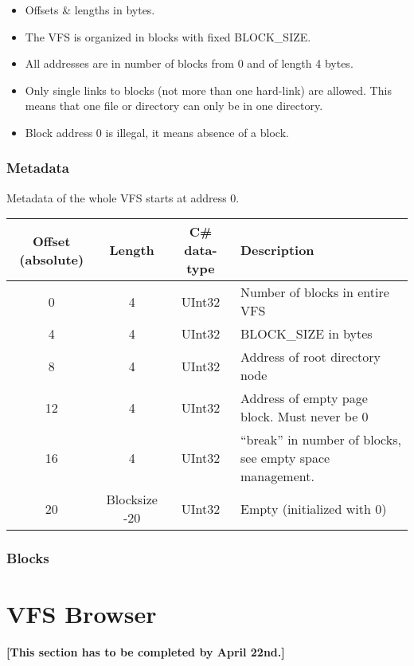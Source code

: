 \documentclass[a4paper,12pt]{article}
\begin{document}
\begin{itemize}
	\item Offsets \& lengths in bytes.
	\item The VFS is organized in blocks with fixed BLOCK\_SIZE.
	\item All addresses are in number of blocks from 0 and of length 4 bytes.
	\item Only single links to blocks (not more than one hard-link) are allowed. This means that one file or directory can only be in one directory.
	\item Block address 0 is illegal, it means absence of a block.
\end{itemize}

\subsubsection{Metadata}

Metadata of the whole VFS starts at address 0.\\

\begin{tabular}{|c|c|c|p{5cm}|}\hline
Offset (absolute)	&Length	&C\# data-type	&Description\\\hline
0	&4	&UInt32	&Number of blocks in entire VFS\\
4	&4	&UInt32	&BLOCK\_SIZE in bytes\\
8	&4	&UInt32	&Address of root directory node\\
12	&4	&UInt32	&Address of empty page block. Must never be 0\\
16	&4	&UInt32	&“break” in number of blocks, see empty space management.\\
20	&Blocksize -20	&UInt32	&Empty (initialized with 0)\\\hline
\end{tabular}

\subsubsection{Blocks}


\section{VFS Browser}

\textbf{[This section has to be completed by April 22nd.]}
\end{document}
